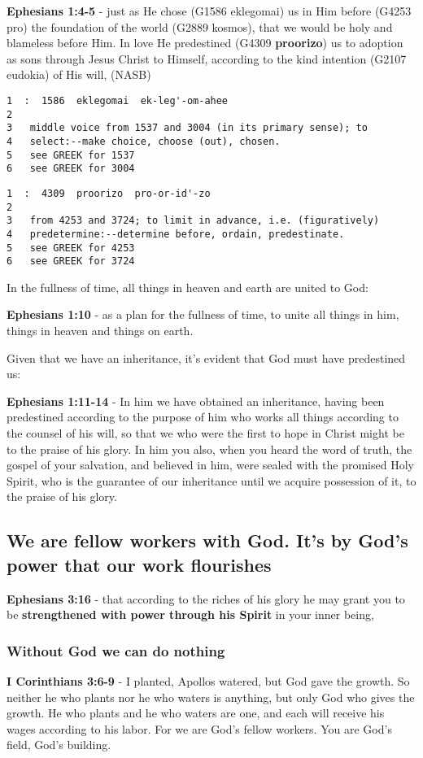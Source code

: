 \documentclass[11pt]{article}
\begin{document}
\textbf{Ephesians 1:4-5} - just as He chose (G1586 eklegomai) us in Him before (G4253 pro) the foundation of the world (G2889 kosmos), that we would be holy and blameless before Him. In love He predestined (G4309 \textbf{proorizo}) us to adoption as sons through Jesus Christ to Himself, according to the kind intention (G2107 eudokia) of His will, (NASB)

\begin{verbatim}
1  :  1586  eklegomai  ek-leg'-om-ahee
2  
3   middle voice from 1537 and 3004 (in its primary sense); to
4   select:--make choice, choose (out), chosen.
5   see GREEK for 1537
6   see GREEK for 3004
\end{verbatim}

\begin{verbatim}
1  :  4309  proorizo  pro-or-id'-zo
2  
3   from 4253 and 3724; to limit in advance, i.e. (figuratively)
4   predetermine:--determine before, ordain, predestinate.
5   see GREEK for 4253
6   see GREEK for 3724
\end{verbatim}

In the fullness of time, all things in heaven and earth are united to God:

\textbf{Ephesians 1:10} - as a plan for the fullness of time, to unite all things in him, things in heaven and things on earth.

Given that we have an inheritance, it's evident that God must have predestined us:

\textbf{Ephesians 1:11-14} - In him we have obtained an inheritance, having been predestined according to the purpose of him who works all things according to the counsel of his will, so that we who were the first to hope in Christ might be to the praise of his glory. In him you also, when you heard the word of truth, the gospel of your salvation, and believed in him, were sealed with the promised Holy Spirit, who is the guarantee of our inheritance until we acquire possession of it, to the praise of his glory.

\subsection{We are fellow workers with God. It's by God's power that our work flourishes}
\label{sec:org95d2ec0}
\textbf{Ephesians 3:16} - that according to the riches of his glory he may grant you to be \textbf{strengthened with power through his Spirit} in your inner being,

\subsubsection{Without God we can do nothing}
\label{sec:orge561bae}
\textbf{I Corinthians 3:6-9} - I planted, Apollos watered, but God gave the growth. So neither he who plants nor he who waters is anything, but only God who gives the growth. He who plants and he who waters are one, and each will receive his wages according to his labor. For we are God's fellow workers. You are God's field, God's building.
\end{document}
